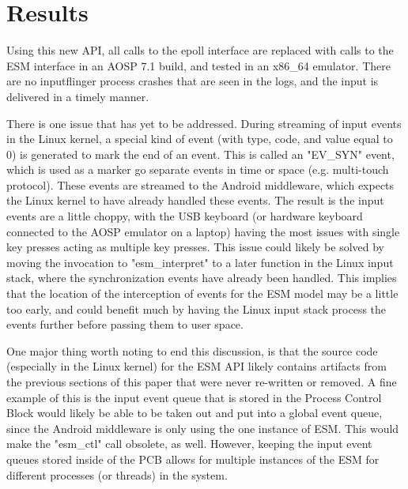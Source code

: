 \documentclass[10pt,journal,compsoc]{IEEEtran}
\begin{document}
\section{Results}
\label{sec:results}
Using this new API, all calls to the epoll interface are replaced with calls to the ESM interface in an AOSP 7.1 build, and tested in an x86\_64 emulator. There are no inputflinger process crashes that are seen in the logs, and the input is delivered in a timely manner.

There is one issue that has yet to be addressed. During streaming of input events in the Linux kernel, a special kind of event (with type, code, and value equal to 0) is generated to mark the end of an event. This is called an "EV\_SYN" event, which is used as a marker go separate events in time or space (e.g. multi-touch protocol). These events are streamed to the Android middleware, which expects the Linux kernel to have already handled these events. The result is the input events are a little choppy, with the USB keyboard (or hardware keyboard connected to the AOSP emulator on a laptop) having the most issues with single key presses acting as multiple key presses. This issue could likely be solved by moving the invocation to "esm\_interpret" to a later function in the Linux input stack, where the synchronization events have already been handled. This implies that the location of the interception of events for the ESM model may be a little too early, and could benefit much by having the Linux input stack process the events further before passing them to user space.

One major thing worth noting to end this discussion, is that the source code (especially in the Linux kernel) for the ESM API likely contains artifacts from the previous sections of this paper that were never re-written or removed. A fine example of this is the input event queue that is stored in the Process Control Block would likely be able to be taken out and put into a global event queue, since the Android middleware is only using the one instance of ESM. This would make the "esm\_ctl" call obsolete, as well. However, keeping the input event queues stored inside of the PCB allows for multiple instances of the ESM for different processes (or threads) in the system.


{}
\textbf{}
\end{document}
